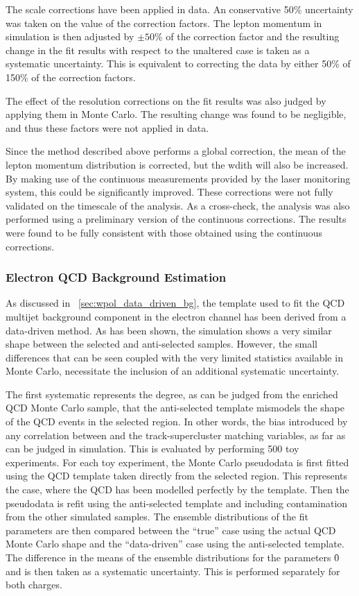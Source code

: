 The scale corrections have been applied in data. An conservative 50\%
uncertainty was taken on the value of the correction factors. The lepton
momentum in simulation is then adjusted by $\pm 50\%$ of the correction factor
and the resulting change in the fit results with respect to the unaltered case
is taken as a systematic uncertainty. This is equivalent to correcting the data
by either 50\% of 150\% of the correction factors.

The effect of the resolution corrections on the fit results was also judged by
applying them in Monte Carlo. The resulting change was found to be negligible,
and thus these factors were not applied in data.

Since the method described above performs a global correction, the mean of the
lepton momentum distribution is corrected, but the wdith will also be
increased. By making use of the continuous measurements provided by the laser
monitoring system, this could be significantly improved. These corrections were
not fully validated on the timescale of the analysis. As a cross-check, the
analysis was also performed using a preliminary version of the continuous
corrections. The results were found to be fully consistent with those obtained
using the continuous corrections.

\subsubsection{Electron \ac{QCD} Background Estimation}
\label{sec:wpol_syst_ele_bgest}
As discussed in \sec~\ref{sec:wpol_data_driven_bg}, the template used to fit
the \ac{QCD} multijet background component in the electron channel has been
derived from a data-driven method. As has been shown, the simulation shows a
very similar \LP shape between the selected and anti-selected samples. However,
the small differences that can be seen coupled with the very limited statistics
available in Monte Carlo, necessitate the inclusion of an additional systematic
uncertainty.

The first systematic represents the degree, as can be judged from the enriched
\ac{QCD} Monte Carlo sample, that the anti-selected template mismodels the \LP
shape of the \ac{QCD} events in the selected region. In other words, the bias
introduced by any correlation between \LP and the track-supercluster matching
variables, as far as can be judged in simulation. This is evaluated by
performing 500 toy experiments. For each toy experiment, the Monte Carlo
pseudodata is first fitted using the \ac{QCD} template taken directly from the
selected region. This represents the case, where the \ac{QCD} has been modelled
perfectly by the template. Then the pseudodata is refit using the anti-selected
template and including contamination from the other simulated samples. The
ensemble distributions of the fit parameters are then compared between the
``true'' case using the actual \ac{QCD} Monte Carlo shape and the
``data-driven'' case using the anti-selected template. The difference in the
means of the ensemble distributions for the parameters \f0 and \fLmfR is then
taken as a systematic uncertainty. This is performed separately for both
charges.

